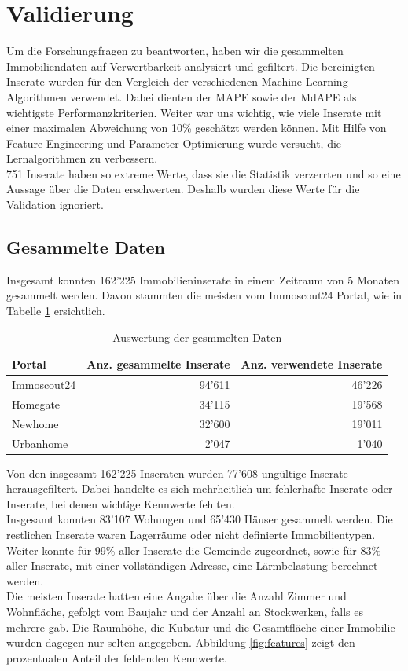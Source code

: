 \section{Validierung}
Um die Forschungsfragen zu beantworten, haben wir die gesammelten Immobiliendaten auf Verwertbarkeit analysiert und gefiltert. Die bereinigten Inserate wurden für den Vergleich der verschiedenen Machine Learning Algorithmen verwendet. Dabei dienten der MAPE sowie der MdAPE als wichtigste Performanzkriterien. Weiter war uns wichtig, wie viele Inserate mit einer maximalen Abweichung von 10\% geschätzt werden können. Mit Hilfe von Feature Engineering und Parameter Optimierung wurde versucht, die Lernalgorithmen zu verbessern.\\
751 Inserate haben so extreme Werte, dass sie die Statistik verzerrten und so eine Aussage über die Daten erschwerten. Deshalb wurden diese Werte für die Validation ignoriert.

\subsection{Gesammelte Daten}
Insgesamt konnten 162’225 Immobilieninserate in einem Zeitraum von 5 Monaten gesammelt werden. Davon stammten die meisten vom Immoscout24 Portal, wie in Tabelle \ref{tab:crawled_data} ersichtlich.

\begin{table}[ht]
\centering
{}
\begin{tabular}{@{}lrr@{}}
\toprule
Portal &  Anz. gesammelte Inserate & Anz. verwendete Inserate \\
\midrule
Immoscout24 & 94'611 & 46'226\\
Homegate & 34'115 & 19'568\\
Newhome & 32'600 & 19'011\\
Urbanhome & 2'047 & 1'040\\
\bottomrule
\end{tabular}
\caption{Auswertung der gesmmelten Daten}
\label{tab:crawled_data}
\end{table}

Von den insgesamt 162’225 Inseraten wurden 77’608 ungültige Inserate herausgefiltert.
Dabei handelte es sich mehrheitlich um fehlerhafte Inserate oder Inserate, bei denen wichtige Kennwerte fehlten.\\
Insgesamt konnten 83’107 Wohungen und 65’430 Häuser gesammelt werden. Die restlichen Inserate waren Lagerräume oder nicht definierte Immobilien\-typen.\\
Weiter konnte für 99\% aller Inserate die Gemeinde zugeordnet, sowie für 83\% aller Inserate, mit einer vollständigen Adresse, eine Lärmbelastung berechnet werden.\\
Die meisten Inserate hatten eine Angabe über die Anzahl Zimmer und Wohnfläche, gefolgt vom Baujahr und der Anzahl an Stockwerken, falls es mehrere gab. Die Raumhöhe, die Kubatur und die Gesamtfläche einer Immobilie wurden dagegen nur selten angegeben. Abbildung \ref{fig:features} zeigt den prozentualen Anteil der fehlenden Kennwerte.

